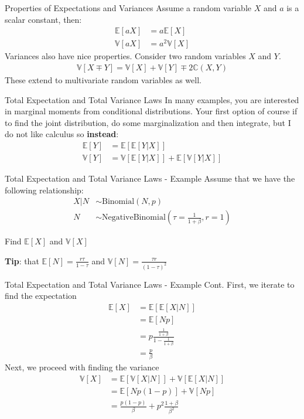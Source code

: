 \documentclass{beamer}
\begin{document}
\begin{frame}{Properties of Expectations and Variances}
Assume a random variable $X$ and $a$ is a scalar constant, then:
\begin{align*}
\mathbb{E}[aX] &= a \mathbb{E}[X] \\
\mathbb{V}[aX] &= a^{2} \mathbb{V}[X]
\end{align*}
Variances also have nice properties. Consider two random variables $X$ and $Y$.
\begin{align*}
\mathbb{V}[X \mp Y] = \mathbb{V}[X] + \mathbb{V}[Y] \mp 2\mathbb{C}(X,Y)
\end{align*}
These extend to multivariate random variables as well.
\end{frame}


\begin{frame}{Total Expectation and Total Variance Laws}
In many examples, you are interested in marginal moments from conditional distributions. Your first option of course if to find the joint distribution, do some marginalization and then integrate, but I do not like calculus so \textbf{instead}:
\begin{align*}
\mathbb{E}[Y] &= \mathbb{E}[\mathbb{E}[Y|X]] \\
\mathbb{V}[Y] &= \mathbb{V}[\mathbb{E}[Y|X]] + \mathbb{E}[\mathbb{V}[Y|X]]
\end{align*}
\end{frame}

\begin{frame}{Total Expectation and Total Variance Laws - Example}
Assume that we have the following relationship:
\begin{align*}
X|N &\sim \mathrm{Binomial}(N, p) \\
N &\sim\mathrm{Negative Binomial}(\tau = \frac{1}{1+\beta}, r = 1)
\end{align*}
\newline

Find $\mathbb{E}[X]$ and $\mathbb{V}[X]$
\newline

\textbf{Tip}: that $\mathbb{E}[N] = \frac{r\tau}{1-\tau}$ and $\mathbb{V}[N] = \frac{\tau r}{(1-\tau)^{2}} $
\end{frame}

\begin{frame}{Total Expectation and Total Variance Laws - Example Cont.}
First, we iterate to find the expectation
\begin{align*}
\mathbb{E}[X] &= \mathbb{E}[\mathbb{E}[X|N]]\\
&= \mathbb{E}[Np]\\
&= p\frac{\frac{1}{1+\beta}}{1-\frac{1}{1+\beta}}\\
&= \frac{p}{\beta}
\end{align*}
Next, we proceed with finding the variance
\begin{align*}
\mathbb{V}[X] &= \mathbb{E}[\mathbb{V}[X|N]] + \mathbb{V}[\mathbb{E}[X|N]] \\
&= \mathbb{E}[Np(1-p)] + \mathbb{V}[Np]\\
&= \frac{p(1-p)}{\beta} + p^{2}\frac{1+\beta}{\beta^{2}}
\end{align*}
\end{frame}
\end{document}
